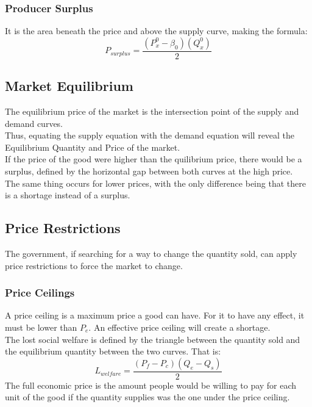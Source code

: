 \documentclass[nobib]{article}
\begin{document}
\subsubsection{Producer Surplus}
It is the area beneath the price and above the supply curve, making the
formula:
\begin{equation*}
    P_{surplus} = \frac{(P_x^0 - \beta_0)(Q_x^0)}{2}
\end{equation*}
\subsection{Market Equilibrium}
The equilibrium price of the market is the intersection point of the supply and
demand curves.\\ Thus, equating the supply equation with the demand equation
will reveal the Equilibrium Quantity and Price of the market.\\ If the price of
the good were higher than the quilibrium price, there would be a surplus,
defined by the horizontal gap between both curves at the high price.\\ The same
thing occurs for lower prices, with the only difference being that there is a
shortage instead of a surplus.\\
\subsection{Price Restrictions}
The government, if searching for a way to change the quantity sold, can apply
price restrictions to force the market to change.\\
\subsubsection{Price Ceilings}
A price ceiling is a maximum price a good can have. For it to have any effect,
it must be lower than $P_e$. An effective price ceiling will create a
shortage.\\ The lost social welfare is defined by the triangle between the
quantity sold and the equilibrium quantity between the two curves. That is:
\begin{equation*}
    L_{welfare} =\frac{(P_f-P_c)(Q_e-Q_s)}{2}
\end{equation*}
The full economic price is the amount people would be willing to pay for each unit of the good if the quantity supplies was the one under the price ceiling.\\
\end{document}
